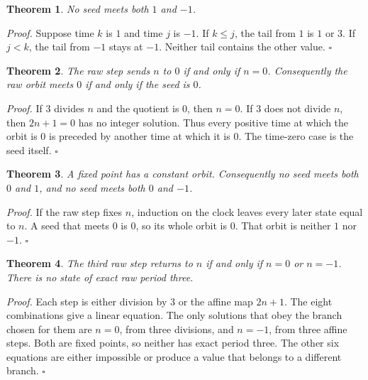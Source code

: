 \documentclass[11pt,letterpaper]{article}
\newtheorem{theorem}{Theorem}
\newenvironment{proof}{\noindent\textit{Proof.}}{\hfill\(\square\)}
\begin{document}
\begin{theorem}
\label{thm:disjoint}
No seed meets both \(1\) and \(-1\).
\end{theorem}

\begin{proof}
Suppose time \(k\) is \(1\) and time \(j\) is \(-1\). If \(k\le j\), the tail from \(1\) is \(1\) or \(3\). If \(j<k\), the tail from \(-1\) stays at \(-1\). Neither tail contains the other value.
\end{proof}

\begin{theorem}
\label{thm:zero}
The raw step sends \(n\) to \(0\) if and only if \(n=0\). Consequently the raw orbit meets \(0\) if and only if the seed is \(0\).
\end{theorem}

\begin{proof}
If \(3\) divides \(n\) and the quotient is \(0\), then \(n=0\). If \(3\) does not divide \(n\), then \(2n+1=0\) has no integer solution. Thus every positive time at which the orbit is \(0\) is preceded by another time at which it is \(0\). The time-zero case is the seed itself.
\end{proof}

\begin{theorem}
\label{thm:separate}
A fixed point has a constant orbit. Consequently no seed meets both \(0\) and \(1\), and no seed meets both \(0\) and \(-1\).
\end{theorem}

\begin{proof}
If the raw step fixes \(n\), induction on the clock leaves every later state equal to \(n\). A seed that meets \(0\) is \(0\), so its whole orbit is \(0\). That orbit is neither \(1\) nor \(-1\).
\end{proof}

\begin{theorem}
\label{thm:periodthree}
The third raw step returns to \(n\) if and only if \(n=0\) or \(n=-1\). There is no state of exact raw period three.
\end{theorem}

\begin{proof}
Each step is either division by \(3\) or the affine map \(2n+1\). The eight combinations give a linear equation. The only solutions that obey the branch chosen for them are \(n=0\), from three divisions, and \(n=-1\), from three affine steps. Both are fixed points, so neither has exact period three. The other six equations are either impossible or produce a value that belongs to a different branch.
\end{proof}
\end{document}

